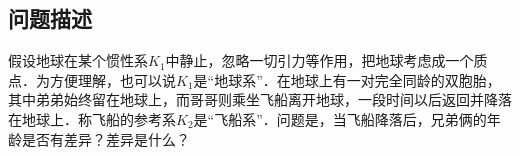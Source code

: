 

\subsection{问题描述}

假设地球在某个惯性系$K_1$中静止，忽略一切引力等作用，把地球考虑成一个质点．为方便理解，也可以说$K_1$是“地球系”．在地球上有一对完全同龄的双胞胎，其中弟弟始终留在地球上，而哥哥则乘坐飞船离开地球，一段时间以后返回并降落在地球上．称飞船的参考系$K_2$是“飞船系”．问题是，当飞船降落后，兄弟俩的年龄是否有差异？差异是什么？


  




